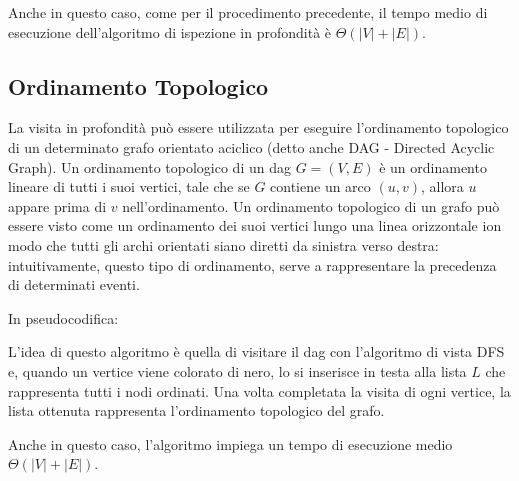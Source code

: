 Anche in questo caso, come per il procedimento precedente, il tempo medio di esecuzione dell'algoritmo di ispezione in profondità è \(\Theta(|V|+|E|)\).

\subsection{Ordinamento Topologico}
La visita in profondità può essere utilizzata per eseguire l'ordinamento  topologico di un determinato grafo orientato aciclico (detto anche DAG - Directed Acyclic Graph). Un ordinamento topologico di un dag \(G=(V,E)\) è un ordinamento lineare di tutti i suoi vertici, tale che se \(G\) contiene un arco \((u,v)\), allora \(u\) appare prima di \(v\) nell'ordinamento. Un ordinamento topologico di un grafo può essere visto come un ordinamento dei suoi vertici lungo una linea orizzontale ion modo che tutti gli archi orientati siano diretti da sinistra verso destra: intuitivamente, questo tipo di ordinamento, serve a rappresentare la precedenza di determinati eventi. 

In pseudocodifica:




L'idea di questo algoritmo è quella di visitare il dag con l'algoritmo di vista DFS e, quando un vertice viene colorato di nero, lo si inserisce in testa alla lista \(L\) che rappresenta tutti i nodi ordinati. Una volta completata la visita di ogni vertice, la lista ottenuta rappresenta l'ordinamento topologico del grafo. 

Anche in questo caso, l'algoritmo impiega un tempo di esecuzione medio \(\Theta(|V|+|E|)\).  
